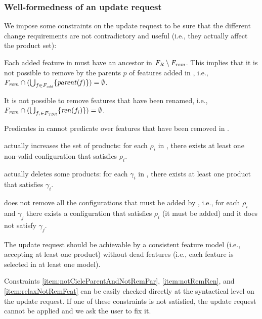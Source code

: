 \begin{tikzborder}{\cite{Gargantini16:validation}}
\begin{tikzborder}{\cite{gargantini_combinatorial_2017}}
\begin{tikzborder}{\cite{gargantini_combinatorial_2017}}
\begin{tikzborder}{\cite{garn2019}}
\begin{tikzborder}{\cite{arcaini2019achieving}}
	\subsubsection{Well-formedness of an update request}\label{sec:wfUpdReq}
	
	\bb We impose some constraints on the update request to be sure that the different change requirements are not contradictory and useful (i.e., they actually affect the product set):
	\begin{compactenum}
		\item \label{item:notCicleParentAndNotRemPar} Each added feature in \Fadd must have an ancestor in $\mathit{F_R}\setminus\mathit{F_{rem}}$. This implies that it is not possible to remove by \Frem the parents $p$ of features added in \Fadd, i.e., $\mathit{F_{rem}} \cap (\bigcup_{f \in \mathit{F_{add}}} \{\mathit{parent(f)}\}) = \emptyset$.
		\item \label{item:notRemRen} It is not possible to remove features that have been renamed, i.e., $\mathit{F_{rem}} \cap (\bigcup_{f_i \in \mathit{F_{TBR}}} \{\mathit{ren}(f_i)\}) = \emptyset$.
		\item \label{item:relaxNotRemFeat} Predicates in \CFrelax cannot predicate over features that have been removed in \Frem.
		\item \label{item:relaxEffective} \CFrelax actually increases the set of products: for each $\rho_i$ in \CFrelax, there exists at least one non-valid configuration that satisfies $\rho_i$.
		\item \label{item:remEffective} \CFrem actually deletes some products: for each $\gamma_i$ in \CFrem, there exists at least one product that satisfies $\gamma_i$.
		\item \label{item:remNotBossy} \CFrem does not remove all the configurations that must be added by \CFrelax, i.e., for each $\rho_i$ and $\gamma_j$ there exists a configuration that satisfies $\rho_i$ (it must be added) and it does not satisfy $\gamma_j$.
		\item \label{item:notIncons} The update request should be achievable by a consistent feature model (i.e., accepting at least one product) without dead features (i.e., each feature is selected in at least one model).
	\end{compactenum}
	
	Constraints
	\ref{item:notCicleParentAndNotRemPar},
	\ref{item:notRemRen}, and \ref{item:relaxNotRemFeat} can be easily checked directly at the syntactical level on the update request. If one of these constraints is not satisfied, the update request cannot be applied and we ask the user to fix it.
	

\end{tikzborder}
\end{tikzborder}
\end{tikzborder}
\end{tikzborder}
\end{tikzborder}
